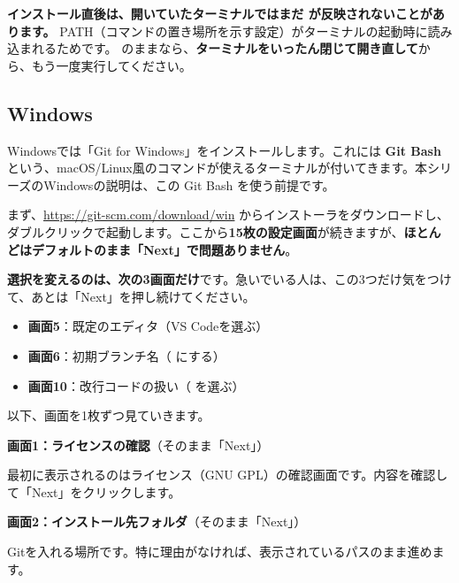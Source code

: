 \begin{warnbox}
\textbf{インストール直後は、開いていたターミナルではまだ  が反映されないことがあります。} PATH（コマンドの置き場所を示す設定）がターミナルの起動時に読み込まれるためです。 のままなら、\textbf{ターミナルをいったん閉じて開き直して}から、もう一度実行してください。
\end{warnbox}

\subsection{Windows}
\label{sec:install-win}

Windowsでは「Git for Windows」をインストールします。これには \textbf{Git Bash} という、macOS/Linux風のコマンドが使えるターミナルが付いてきます。本シリーズのWindowsの説明は、この Git Bash を使う前提です。

まず、\url{https://git-scm.com/download/win} からインストーラをダウンロードし、ダブルクリックで起動します。ここから\textbf{15枚の設定画面}が続きますが、\textbf{ほとんどはデフォルトのまま「Next」で問題ありません}。

\begin{hintbox}
\textbf{選択を変えるのは、次の3画面だけ}です。急いでいる人は、この3つだけ気をつけて、あとは「Next」を押し続けてください。
\begin{itemize}[leftmargin=1.4em, nosep]
  \item \textbf{画面5}：既定のエディタ（VS Codeを選ぶ）
  \item \textbf{画面6}：初期ブランチ名（ にする）
  \item \textbf{画面10}：改行コードの扱い（ を選ぶ）
\end{itemize}
\end{hintbox}

以下、画面を1枚ずつ見ていきます。

\medskip
\noindent\textbf{画面1：ライセンスの確認}（そのまま「Next」）

最初に表示されるのはライセンス（GNU GPL）の確認画面です。内容を確認して「Next」をクリックします。

\medskip
\noindent\textbf{画面2：インストール先フォルダ}（そのまま「Next」）

Gitを入れる場所です。特に理由がなければ、表示されているパスのまま進めます。

